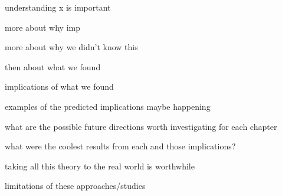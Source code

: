 
understanding x is important

more about why imp

more about why we didn't know this

then about what we found

implications of what we found

examples of the predicted implications maybe happening

what are the possible future directions worth investigating for each chapter

what were the coolest results from each and those implications?

taking all this theory to the real world is worthwhile


limitations of these approaches/studies